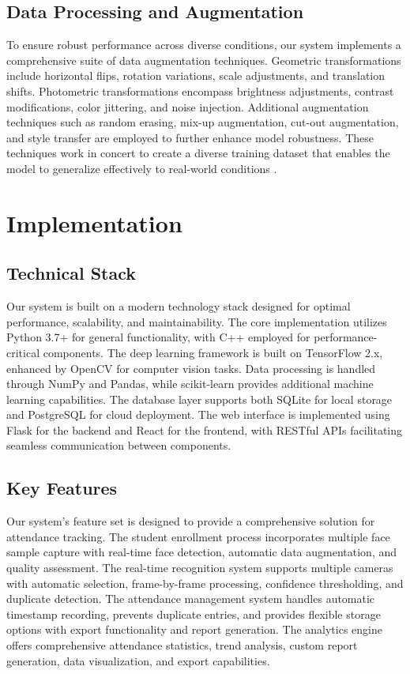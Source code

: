 \documentclass[conference]{IEEEtran}
\begin{document}
\subsection{Data Processing and Augmentation}
To ensure robust performance across diverse conditions, our system implements a comprehensive suite of data augmentation techniques. Geometric transformations include horizontal flips, rotation variations, scale adjustments, and translation shifts. Photometric transformations encompass brightness adjustments, contrast modifications, color jittering, and noise injection. Additional augmentation techniques such as random erasing, mix-up augmentation, cut-out augmentation, and style transfer are employed to further enhance model robustness. These techniques work in concert to create a diverse training dataset that enables the model to generalize effectively to real-world conditions \cite{b11}.

\section{Implementation}

\subsection{Technical Stack}
Our system is built on a modern technology stack designed for optimal performance, scalability, and maintainability. The core implementation utilizes Python 3.7+ for general functionality, with C++ employed for performance-critical components. The deep learning framework is built on TensorFlow 2.x, enhanced by OpenCV for computer vision tasks. Data processing is handled through NumPy and Pandas, while scikit-learn provides additional machine learning capabilities. The database layer supports both SQLite for local storage and PostgreSQL for cloud deployment. The web interface is implemented using Flask for the backend and React for the frontend, with RESTful APIs facilitating seamless communication between components.

\subsection{Key Features}
Our system's feature set is designed to provide a comprehensive solution for attendance tracking. The student enrollment process incorporates multiple face sample capture with real-time face detection, automatic data augmentation, and quality assessment. The real-time recognition system supports multiple cameras with automatic selection, frame-by-frame processing, confidence thresholding, and duplicate detection. The attendance management system handles automatic timestamp recording, prevents duplicate entries, and provides flexible storage options with export functionality and report generation. The analytics engine offers comprehensive attendance statistics, trend analysis, custom report generation, data visualization, and export capabilities.
\end{document}
